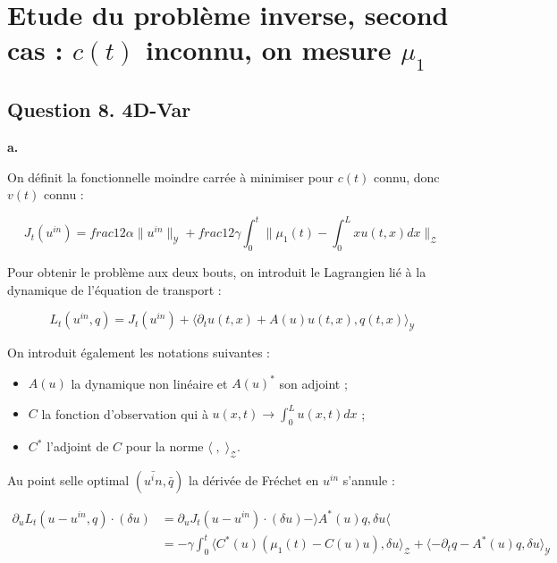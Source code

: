 \documentclass[a4paper]{article}
\newcommand{\Y}{\mathscr{Y}}
\newcommand{\Z}{\mathscr{Z}}
\begin{document}
\section{Etude du problème inverse, second cas : $c(t)$ inconnu, on mesure $\mu_1$}

				
\subsection*{Question 8. 4D-Var}


\textbf{a.}

On définit la fonctionnelle moindre carrée à minimiser pour $c(t)$ connu, donc $v(t)$ connu :

\[ J_t(u^{in}) = \displaystyle frac{1}{2}      
              \alpha \| u^{in} \|_{\Y} +  
			  \displaystyle frac{1}{2}      
			  \gamma \int_0^t \| \mu_1(t) - \int_0^L x u(t,x)dx \|_{\Z} \]

Pour obtenir le problème aux deux bouts, on introduit le Lagrangien lié à la dynamique de l'équation de transport :

\[ L_t(u^{in},q) = J_t(u^{in}) + \langle \partial_t u(t,x) + A(u) u(t,x), q(t,x) \rangle_{\Y} \]

On introduit également les notations suivantes :
\begin{itemize}
    \item $A(u)$ la dynamique non linéaire et $A(u)^*$ son adjoint ;
	\item $C$ la fonction d'observation qui à $u(x,t) \to \int_0^L u(x,t)dx$ ;
	\item $C^*$ l'adjoint de $C$ pour la norme $\langle \;, \; \rangle_{\Z}$.
\end{itemize}
Au point selle optimal $(\bar{u^in}, \bar{q})$ la dérivée de Fréchet en $u^{in}$ s'annule :

\[ \begin{split}
\partial_{u}L_t(u-u^{in},q) \cdot (\delta u) &= \partial_u J_t(u-u^{in}) \cdot (\delta u)  - \rangle A^*(u)q , \delta u \langle \\
                                      &= - \gamma \int_0^t \langle C^*(u) (\mu_1(t) - C(u)u ), \delta u \rangle_{\Z} 
										 + \langle - \partial_t q - A^*(u)q , \delta u \rangle_{\Y}
\end{split}\]
\end{document}
